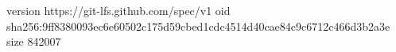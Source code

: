 version https://git-lfs.github.com/spec/v1
oid sha256:9ff8380093ec6e60502c175d59cbed1cdc4514d40cae84c9c6712c466d3b2a3e
size 842007
